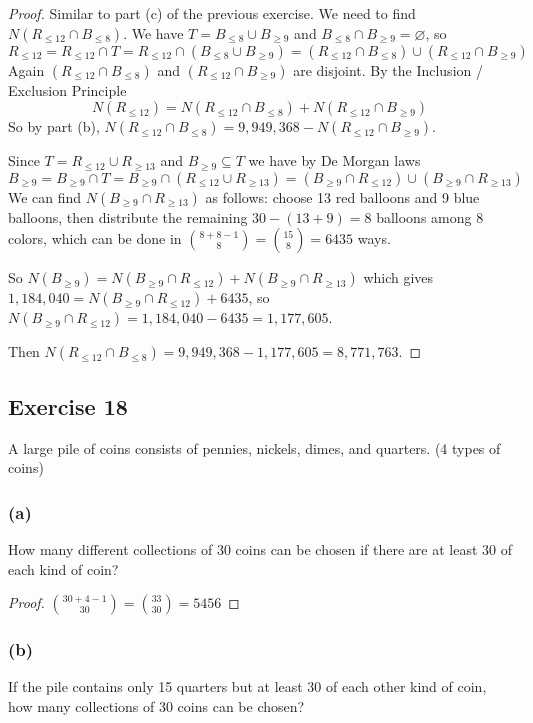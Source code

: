 \documentclass[14pt]{extarticle}
\newcommand{\es}{\varnothing}
\begin{document}
\begin{proof}
Similar to part (c) of the previous exercise. We need to find \(N(R_{\leq 12} \cap B_{\leq 8})\). We have \(T = B_{\leq 8}
\cup B_{\geq 9}\) and \(B_{\leq 8} \cap B_{\geq 9} = \es\), so
\[
R_{\leq 12} = R_{\leq 12} \cap T = R_{\leq 12} \cap (B_{\leq 8} \cup B_{\geq 9}) = (R_{\leq 12} \cap B_{\leq 8}) \cup
(R_{\leq 12} \cap B_{\geq 9})
\]
Again \((R_{\leq 12} \cap B_{\leq 8})\) and \((R_{\leq 12} \cap B_{\geq 9})\) are disjoint. By the Inclusion / Exclusion
Principle 
\[
N(R_{\leq 12}) = N(R_{\leq 12} \cap B_{\leq 8}) + N(R_{\leq 12} \cap B_{\geq 9})
\]
So by part (b), \(N(R_{\leq 12} \cap B_{\leq 8}) = 9,949,368 - N(R_{\leq 12} \cap B_{\geq 9})\).

Since \(T = R_{\leq 12} \cup R_{\geq 13}\) and \(B_{\geq 9} \subseteq T\) we have by De Morgan laws
\[
B_{\geq 9} = B_{\geq 9} \cap T = B_{\geq 9} \cap (R_{\leq 12} \cup R_{\geq 13}) = (B_{\geq 9} \cap R_{\leq 12}) \cup 
(B_{\geq 9} \cap R_{\geq 13})
\]
We can find \(N(B_{\geq 9} \cap R_{\geq 13})\) as follows: choose 13 red balloons and 9 blue balloons, then distribute 
the remaining \(30 - (13+9) = 8\) balloons among 8 colors, which can be done in \(\binom{8+8-1}{8} = \binom{15}{8} = 
6435\) ways.

So \(N(B_{\geq 9}) = N(B_{\geq 9} \cap R_{\leq 12}) + N(B_{\geq 9} \cap R_{\geq 13})\) which gives \(1,184,040 = 
N(B_{\geq 9} \cap R_{\leq 12}) + 6435\), so \(N(B_{\geq 9} \cap R_{\leq 12}) = 1,184,040 - 6435 = 1,177,605\).

Then \(N(R_{\leq 12} \cap B_{\leq 8}) = 9,949,368 - 1,177,605 = 8,771,763\).
\end{proof}

\subsection{Exercise 18}
A large pile of coins consists of pennies, nickels, dimes, and quarters. (4 types of coins)

\subsubsection{(a)}
How many different collections of 30 coins can be chosen if there are at least 30 of each kind of coin?

\begin{proof}
\(\binom{30+4-1}{30} = \binom{33}{30} = 5456\)
\end{proof}

\subsubsection{(b)}
If the pile contains only 15 quarters but at least 30 of each other kind of coin, how many collections of 30 coins can be 
chosen?
\end{document}
